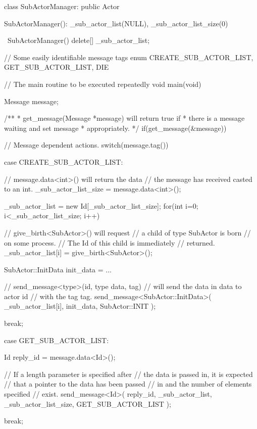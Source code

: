 \documentclass[12pt,a4paper]{article}
\begin{document}
\begin{longcode}[caption=Example Actor]
class SubActorManager: public Actor {
    SubActorManager():
        _sub_actor_list(NULL),
        _sub_actor_list_size(0)
    {}

    ~SubActorManager() {
        delete[] _sub_actor_list;
    }

    // Some easily identifiable message tags
    enum {
        CREATE_SUB_ACTOR_LIST,
        GET_SUB_ACTOR_LIST,
        DIE
    }

    // The main routine to be executed repeatedly
    void main(void) {
        Message message;

        /**
         * get_message(Message *message) will return true if
         * there is a message waiting and set message
         * appropriately.
         */
        if(get_message(&message)) {

            // Message dependent actions.
            switch(message.tag()) {
                case CREATE_SUB_ACTOR_LIST: {

                    // message.data<int>() will return the data
                    // the message has received casted to an int.
                    _sub_actor_list_size = message.data<int>();

                    _sub_actor_list = new Id[_sub_actor_list_size];
                    for(int i=0; i<_sub_actor_list_size; i++) {

                        // give_birth<SubActor>() will request
                        // a child of type SubActor is born
                        // on some process.
                        // The Id of this child is immediately
                        // returned.
                        _sub_actor_list[i] = give_birth<SubActor>();

                        SubActor::InitData init_data = ...

                        // send_message<type>(id, type data, tag)
                        // will send the data in data to actor id
                        // with the tag tag.
                        send_message<SubActor::InitData>(
                            _sub_actor_list[i],
                            init_data,
                            SubActor::INIT
                        );
                    }
                } break;

                case GET_SUB_ACTOR_LIST: {
                    Id reply_id = message.data<Id>();

                    // If a length parameter is specified after
                    // the data is passed in, it is expected
                    // that a pointer to the data has been passed
                    // in and the number of elements specified
                    // exist.
                    send_message<Id>(
                        reply_id,
                        _sub_actor_list, _sub_actor_list_size,
                        GET_SUB_ACTOR_LIST
                    );
                } break;

}}}}
\end{longcode}
\end{document}
